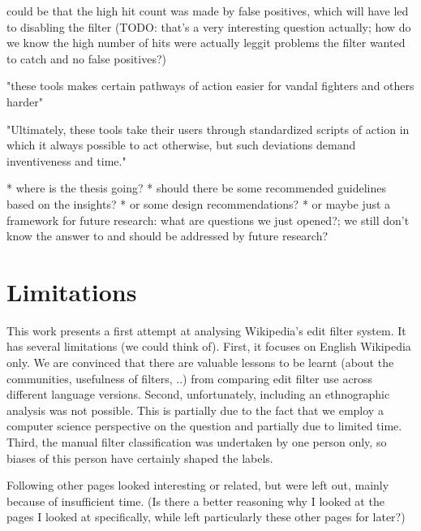  could be that the high hit count was made by false positives, which will have led to disabling the filter (TODO: that's a very interesting question actually; how do we know the high number of hits were actually leggit problems the filter wanted to catch and no false positives?)

\cite{GeiRib2010}

"these tools makes certain pathways of action easier for vandal
fighters and others harder"

"Ultimately, these tools take their users
through standardized scripts of action in which it always
possible to act otherwise, but such deviations demand
inventiveness and time."

* where is the thesis going?
  * should there be some recommended guidelines based on the insights?
  * or some design recommendations?
  * or maybe just a framework for future research: what are questions we just opened?; we still don't know the answer to and should be addressed by future research?

\section{Limitations}

This work presents a first attempt at analysing Wikipedia's edit filter system.
It has several limitations (we could think of).
First, it focuses on English Wikipedia only.
We are convinced that there are valuable lessons to be learnt (about the communities, usefulness of filters, ..) from comparing edit filter use across different language versions.
Second, unfortunately, including an ethnographic analysis was not possible.
This is partially due to the fact that we employ a computer science perspective on the question and partially due to limited time.
Third, the manual filter classification was undertaken by one person only, so biases of this person have certainly shaped the labels.


Following other pages looked interesting or related, but were left out, mainly because of insufficient time.
(Is there a better reasoning why I looked at the pages I looked at specifically, while left particularly these other pages for later?)

